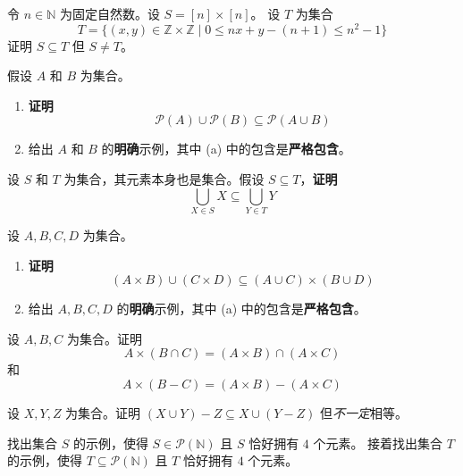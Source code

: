 \clearpage

\begin{exercise}
    令 $n \in \mathbb{N}$ 为固定自然数。设 $S = [n] \times [n]$。 设 $T$ 为集合
    \[T =\Big\{(x, y) \in \mathbb{Z} \times \mathbb{Z} \mid 0 \le nx + y - (n + 1) \le n^2 - 1\Big\}\]
    证明 $S \subseteq T$ 但 $S \ne T$。
\end{exercise}

\begin{exercise}
    假设 $A$ 和 $B$ 为集合。
    \begin{enumerate}[label=(\alph*)]
        \item \textbf{证明} 
        \[\mathcal{P}(A) \cup \mathcal{P}(B) \subseteq \mathcal{P}(A \cup B)\]
        \item 给出 $A$ 和 $B$ 的\textbf{明确}示例，其中 (a) 中的包含是\textbf{严格包含}。
    \end{enumerate}
\end{exercise}

\begin{exercise}
    设 $S$ 和 $T$ 为集合，其元素本身也是集合。假设 $S \subseteq T$，\textbf{证明} 
    \[\bigcup_{X \in S} X \subseteq \bigcup_{Y \in T} Y\]
\end{exercise}

\begin{exercise}
    设 $A, B, C, D$ 为集合。
    \begin{enumerate}[label=(\alph*)]
        \item \textbf{证明} 
        \[(A \times B) \cup (C \times D) \subseteq (A \cup C) \times (B \cup D)\]
        \item 给出 $A,B,C,D$ 的\textbf{明确}示例，其中 (a) 中的包含是\textbf{严格包含}。
    \end{enumerate}
\end{exercise}

\begin{exercise}
    设 $A, B, C$ 为集合。证明
        \[A \times (B \cap C) = (A \times B) \cap (A \times C)\]
    和
        \[A \times (B - C) = (A \times B) - (A \times C)\]
\end{exercise}

\begin{exercise}\label{exc:exercises3.11.17}
    设 $X,Y,Z$ 为集合。证明 $(X \cup Y ) - Z \subseteq X \cup (Y - Z)$ 但\emph{不一定}相等。
\end{exercise}

\begin{exercise}
    找出集合 $S$ 的示例，使得 $S \in \mathcal{P}(\mathbb{N})$ 且 $S$ 恰好拥有 $4$ 个元素。
    接着找出集合 $T$ 的示例，使得 $T \subseteq \mathcal{P}(\mathbb{N})$ 且 $T$ 恰好拥有 $4$ 个元素。
\end{exercise}

